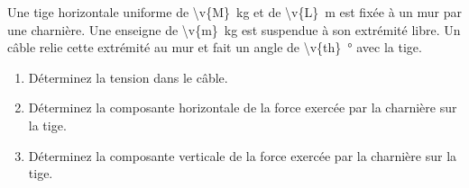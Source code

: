 \begin{minipage}{0.55\linewidth}
Une tige horizontale uniforme de \qty{\v{M}}{kg} et de \qty{\v{L}}{m} est fixée à un mur par une charnière. Une enseigne de \qty{\v{m}}{kg} est suspendue à son extrémité libre. Un câble relie cette extrémité au mur et fait un angle de \qty{\v{th}}{\degree} avec la tige.
\end{minipage}\hfill
\begin{minipage}{0.4\linewidth}
\centering
{}
\end{minipage}

\begin{enumerate}[label=\alph*)]
    \item Déterminez la tension dans le câble.
    \item Déterminez la composante horizontale de la force exercée par la charnière sur la tige.
    \item Déterminez la composante verticale de la force exercée par la charnière sur la tige.
\end{enumerate}
